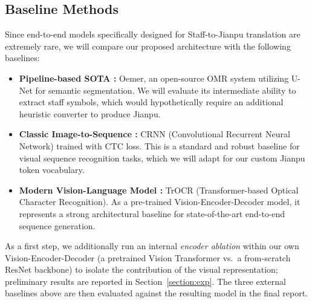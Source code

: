 \subsection{Baseline Methods}
Since end-to-end models specifically designed for Staff-to-Jianpu translation are extremely rare, we will compare our proposed architecture with the following baselines:
\begin{itemize}
    \item \textbf{Pipeline-based SOTA \citep{oemer2023}:} Oemer, an open-source OMR system utilizing U-Net for semantic segmentation. We will evaluate its intermediate ability to extract staff symbols, which would hypothetically require an additional heuristic converter to produce Jianpu.
    \item \textbf{Classic Image-to-Sequence \citep{shi2015crnn}:} CRNN (Convolutional Recurrent Neural Network) trained with CTC loss. This is a standard and robust baseline for visual sequence recognition tasks, which we will adapt for our custom Jianpu token vocabulary.
    \item \textbf{Modern Vision-Language Model \citep{li2021trocr}:} TrOCR (Transformer-based Optical Character Recognition). As a pre-trained Vision-Encoder-Decoder model, it represents a strong architectural baseline for state-of-the-art end-to-end sequence generation.
\end{itemize}
As a first step, we additionally run an internal \emph{encoder ablation} within our own Vision-Encoder-Decoder (a pretrained Vision Transformer vs.\ a from-scratch ResNet backbone) to isolate the contribution of the visual representation; preliminary results are reported in Section~\ref{section:exp}. The three external baselines above are then evaluated against the resulting model in the final report.

